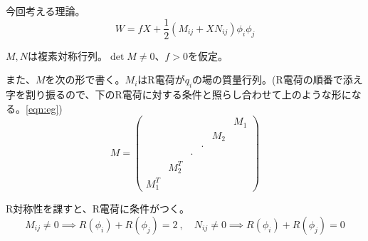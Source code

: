 \documentclass[
  unicode,a4paper,9pt,
  xcolor = {dvipsnames,svgnames},
  hyperref ={colorlinks=true,citecolor=Navy,linkcolor=NavyBlue,urlcolor=purple},
  ja=standard,lualatex
]{beamer}
\begin{document}
\begin{frame}
  \frametitle{\subsecname}

  今回考える理論。
  \begin{equation}
    W
    =
    fX
    +
    \frac{1}{2}(M_{ij}+XN_{ij})\phi_{i}\phi_{j}
    \nonumber
  \end{equation}

  $M,N$は複素対称行列。$\det M\neq 0$、$f> 0$を仮定。

  また、$M$を次の形で書く。$M_{i}$はR電荷が$q_{i}$の場の質量行列。(R電荷の順番で添え字を割り振るので、下のR電荷に対する条件と照らし合わせて上のような形になる。\eqref{eqn:eg})
  \begin{equation}
    M
    =
    \begin{pmatrix}
                &           &       &       &       & M_{1} \\
                &           &       &       & M_{2} &       \\
                &           &       & \cdot &       &       \\
                &           & \cdot &       &       &       \\
                & M_{2}^{T} &       &       &       &       \\
      M_{1}^{T} &           &       &       &       &
    \end{pmatrix}
    \nonumber
  \end{equation}

  R対称性を課すと、R電荷に条件がつく。
  \begin{equation}
    M_{ij}\neq 0
    \implies
    R(\phi_{i})+R(\phi_{j})=2
    \ ,\quad
    N_{ij}\neq 0
    \implies
    R(\phi_{i})+R(\phi_{j})=0
    \nonumber
  \end{equation}

\end{frame}
\end{document}
